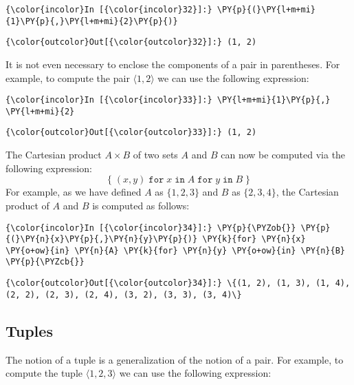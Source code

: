 \begin{Verbatim}[commandchars=\\\{\}]
{\color{incolor}In [{\color{incolor}32}]:} \PY{p}{(}\PY{l+m+mi}{1}\PY{p}{,}\PY{l+m+mi}{2}\PY{p}{)}
\end{Verbatim}


\begin{Verbatim}[commandchars=\\\{\}]
{\color{outcolor}Out[{\color{outcolor}32}]:} (1, 2)
\end{Verbatim}
It is not even necessary to enclose the components of a pair in
parentheses. For example, to compute the pair \(\langle 1, 2 \rangle\)
we can use the following expression:

\begin{Verbatim}[commandchars=\\\{\}]
{\color{incolor}In [{\color{incolor}33}]:} \PY{l+m+mi}{1}\PY{p}{,} \PY{l+m+mi}{2}
\end{Verbatim}

\begin{Verbatim}[commandchars=\\\{\}]
{\color{outcolor}Out[{\color{outcolor}33}]:} (1, 2)
\end{Verbatim}
The Cartesian product \(A \times B\) of two sets \(A\) and \(B\) can now
be computed via the following expression:
\[ \{\; (x, y) \;\texttt{for}\; x \;\texttt{in}\; A\; \texttt{for}\; y\; \texttt{in}\; B\; \} \]
For example, as we have defined \(A\) as \(\{1,2,3\}\) and \(B\) as
\(\{2,3,4\}\), the Cartesian product of \(A\) and \(B\) is computed as
follows:

\begin{Verbatim}[commandchars=\\\{\}]
{\color{incolor}In [{\color{incolor}34}]:} \PY{p}{\PYZob{}} \PY{p}{(}\PY{n}{x}\PY{p}{,}\PY{n}{y}\PY{p}{)} \PY{k}{for} \PY{n}{x} \PY{o+ow}{in} \PY{n}{A} \PY{k}{for} \PY{n}{y} \PY{o+ow}{in} \PY{n}{B} \PY{p}{\PYZcb{}}
\end{Verbatim}


\begin{Verbatim}[commandchars=\\\{\}]
{\color{outcolor}Out[{\color{outcolor}34}]:} \{(1, 2), (1, 3), (1, 4), (2, 2), (2, 3), (2, 4), (3, 2), (3, 3), (3, 4)\}
\end{Verbatim}
            
\subsection{Tuples}\label{tuples}
The notion of a tuple is a generalization of the notion of a pair. For example, to compute the tuple
\(\langle 1, 2, 3 \rangle\) we can use the following expression:

